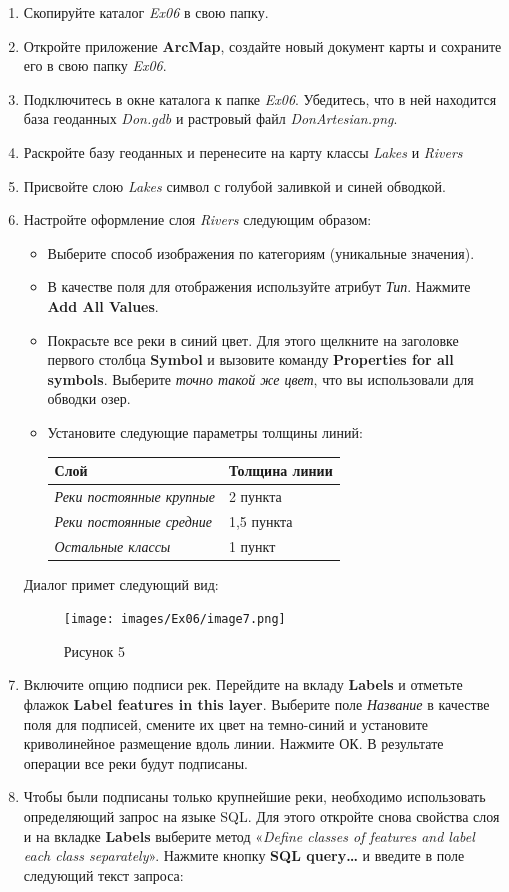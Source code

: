 \documentclass[12pt,]{book}
\begin{document}
\begin{enumerate}
\def\labelenumi{\arabic{enumi}.}
\item
  Скопируйте каталог \emph{Ex06} в свою папку.
\item
  Откройте приложение \textbf{ArcMap}, создайте новый документ карты и сохраните его в свою папку \emph{Ex06}.
\item
  Подключитесь в окне каталога к папке \emph{Ex06}. Убедитесь, что в ней находится база геоданных \emph{Don.gdb} и растровый файл \emph{DonArtesian.png}.
\item
  Раскройте базу геоданных и перенесите на карту классы \emph{Lakes} и \emph{Rivers}
\item
  Присвойте слою \emph{Lakes} символ с голубой заливкой и синей обводкой.
\item
  Настройте оформление слоя \emph{Rivers} следующим образом:

  \begin{itemize}
  \item
    Выберите способ изображения по категориям (уникальные значения).
  \item
    В качестве поля для отображения используйте атрибут \emph{Тип}. Нажмите \textbf{Add All Values}.
  \item
    Покрасьте все реки в синий цвет. Для этого щелкните на заголовке первого столбца \textbf{Symbol} и вызовите команду \textbf{Properties for all symbols}. Выберите \emph{точно такой же цвет}, что вы использовали для обводки озер.
  \item
    Установите следующие параметры толщины линий:

    \begin{longtable}[]{@{}ll@{}}
    \toprule
    Слой & Толщина линии\tabularnewline
    \midrule
    \endhead
    \emph{Реки постоянные крупные} & 2 пункта\tabularnewline
    \emph{Реки постоянные средние} & 1,5 пункта\tabularnewline
    \emph{Остальные классы} & 1 пункт\tabularnewline
    \bottomrule
    \end{longtable}
  \end{itemize}

  Диалог примет следующий вид:

  \begin{figure}
  \centering
  \texttt{[image: images/Ex06/image7.png]}
  \caption{Рисунок 5}
  \end{figure}
\item
  Включите опцию подписи рек. Перейдите на вкладу \textbf{Labels} и отметьте флажок \textbf{Label features in this layer}. Выберите поле \emph{Название} в качестве поля для подписей, смените их цвет на темно-синий и установите криволинейное размещение вдоль линии. Нажмите ОК. В результате операции все реки будут подписаны.
\item
  Чтобы были подписаны только крупнейшие реки, необходимо использовать определяющий запрос на языке SQL. Для этого откройте снова свойства слоя и на вкладке \textbf{Labels} выберите метод «\emph{Define classes of features and label each class separately}». Нажмите кнопку \textbf{SQL query\ldots{}} и введите в поле следующий текст запроса:


\end{enumerate}
\end{document}
